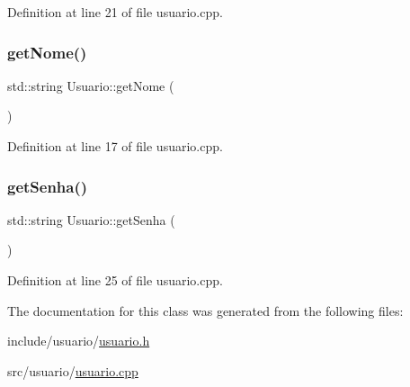 Definition at line 21 of file usuario.\+cpp.

\mbox{\label{class_usuario_a9fd39b37a8f38cfd990aba2234de9ea0}} 
\subsubsection{\texorpdfstring{get\+Nome()}{getNome()}}
{\footnotesize\ttfamily std\+::string Usuario\+::get\+Nome (\begin{DoxyParamCaption}{ }\end{DoxyParamCaption})}



Definition at line 17 of file usuario.\+cpp.

\mbox{\label{class_usuario_afe5b8e2b50dcf24b109357fda3716f7f}} 
\subsubsection{\texorpdfstring{get\+Senha()}{getSenha()}}
{\footnotesize\ttfamily std\+::string Usuario\+::get\+Senha (\begin{DoxyParamCaption}{ }\end{DoxyParamCaption})}



Definition at line 25 of file usuario.\+cpp.



The documentation for this class was generated from the following files\+:\begin{DoxyCompactItemize}
\item 
include/usuario/\hyperlink{usuario_8h}{usuario.\+h}\item 
src/usuario/\hyperlink{usuario_8cpp}{usuario.\+cpp}\end{DoxyCompactItemize}
